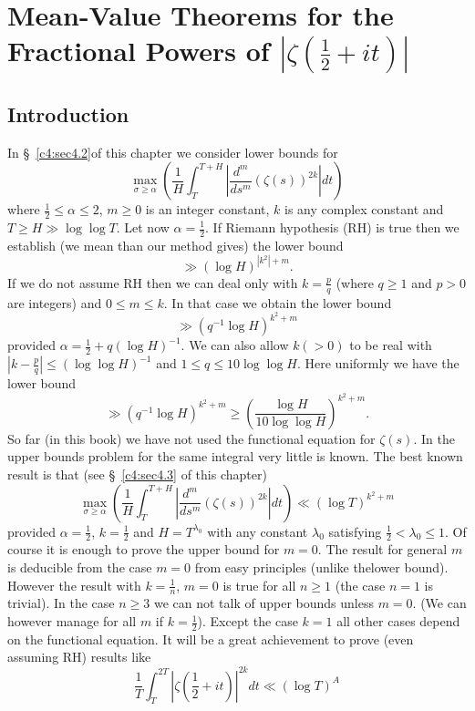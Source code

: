 
\chapter{Mean-Value Theorems for the Fractional Powers of $|\zeta(\frac{1}{2} + it)|$}\label{c4}

\section{Introduction}\label{c4:sec4.1}
In \S\ \ref{c4:sec4.2}\pageoriginale of this chapter we consider lower bounds for 
$$
\max\limits_{\sigma \geq \alpha} \left( \frac{1}{H} \int^{T+H}_T |\frac{d^m}{ds^m} (\zeta(s))^{2k}|d t\right)
$$
where $\frac{1}{2} \leq \alpha \leq 2$, $m\geq 0$ is an integer constant, $k$ is any complex constant and $T \geq H \gg \log \log T$. Let now $\alpha = \frac{1}{2}$. If Riemann hypothesis (RH) is true then we establish (we mean than our method gives) the lower bound
$$
\gg (\log H)^{|k^2| + m}.
$$
If we do not assume RH then we can deal only with $k = \frac{p}{q}$ (where $q \geq 1$ and $p>0$ are integers) and $0 \leq m \leq k$. In that case we obtain the lower bound
$$
\gg (q^{-1} \log H)^{k^2 + m}
$$
provided $\alpha =\frac{1}{2} + q (\log H)^{-1}$. We can also allow $k(> 0)$ to be real with $|k -\frac{p}{q}| \leq (\log \log H)^{-1}$ and $1 \leq q \leq 10 \log \log H$. Here uniformly we have the lower bound
$$
\gg (q^{-1} \log H)^{k^2 + m} \geq \left( \frac{\log H}{10 \log \log H}\right)^{k^2 + m}.
$$
So far (in this book) we have not used the functional equation for $\zeta(s)$. In the upper bounds problem for the same integral very little is known. The best known result is that (see \S\ \ref{c4:sec4.3} of this chapter)
$$
\max\limits_{\sigma \geq \alpha} \left( \frac{1}{H} \int^{T+H}_T |\frac{d^m}{ds^m} (\zeta(s))^{2k} | dt\right) \ll (\log T)^{k^2 + m}
$$
provided $\alpha =\frac{1}{2}$, $k=\frac{1}{2}$ and $H = T^{\lambda_0}$ with any constant $\lambda_0$ satisfying $\frac{1}{2} < \lambda_0 \leq 1$. Of course it is enough to prove the upper bound for $m=0$. The result for general $m$ is deducible from the case $m=0$ from easy principles (unlike the\pageoriginale lower bound). However the result with $k=\frac{1}{n}$, $m=0$ is true for all $n\geq 1$ (the case $n=1$ is trivial). In the case $n\geq 3$ we can not talk of upper bounds unless $m=0$. (We can however manage for all $m$ if $k=\frac{1}{2}$). Except the case $k=1$ all other cases depend on the functional equation. It will be a great achievement to prove (even assuming RH) results like 
$$
\frac{1}{T} \int^{2T}_T |\zeta(\frac{1}{2} + it)|^{2k} dt \ll (\log T)^A
$$
